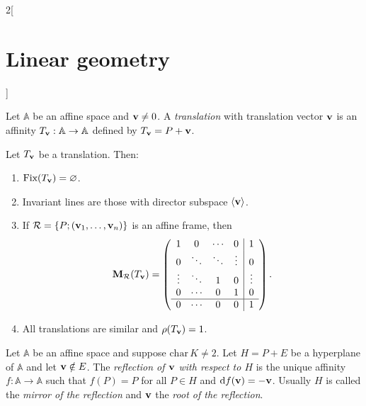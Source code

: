 \documentclass[../../../main.tex]{subfiles}
\begin{document}
\begin{multicols}{2}[\section{Linear geometry}]
\begin{definition}
    \end{definition}
    \begin{definition}[Translations]
        Let $\mathbb{A}$ be an affine space and $\vb{v}\ne 0$. A \textit{translation} with translation vector $\vb{v}$ is an affinity $T_{\vb{v}}:\mathbb{A}\rightarrow\mathbb{A}$ defined by $T_{\vb{v}}=P+\vb{v}$.
    \end{definition}
    \begin{prop}
        Let $T_{\vb{v}}$ be a translation. Then:
        \begin{enumerate}
            \item $\text{Fix}(T_{\vb{v}})=\varnothing$.
            \item Invariant lines are those with director subspace $\langle\vb{v}\rangle$.
            \item If $\mathcal{R}=\{P;(\vb{v}_1,\ldots,\vb{v}_n)\}$ is an affine frame, then $$\vb{M}_\mathcal{R}(T_{\vb{v}})=\left(\begin{array}{cccc|c}
                              1      & 0      & \cdots & 0      & 1      \\
                              0      & \ddots & \ddots & \vdots & 0      \\
                              \vdots & \ddots & 1      & 0      & \vdots \\
                              0      & \cdots & 0      & 1      & 0      \\
                              \hline
                              0      & \cdots & 0      & 0      & 1
                          \end{array}\right).$$
            \item All translations are similar and $\rho(T_{\vb{v}})=1$.
        \end{enumerate}
    \end{prop}
    \begin{definition}[Reflections]
        Let $\mathbb{A}$ be an affine space and suppose $\text{char}\,K\ne 2$. Let $H=P+E$ be a hyperplane of $\mathbb{A}$ and let $\vb{v}\notin E$. The \textit{reflection of $\vb{v}$ with respect to $H$} is the unique affinity $f:\mathbb{A}\rightarrow\mathbb{A}$ such that $f(P)=P$ for all $P\in H$ and $\dd f(\vb{v})=-\vb{v}$. Usually $H$ is called the \textit{mirror of the reflection} and $\vb{v}$ the \textit{root of the reflection}.

\end{definition}
\end{multicols}
\end{document}

